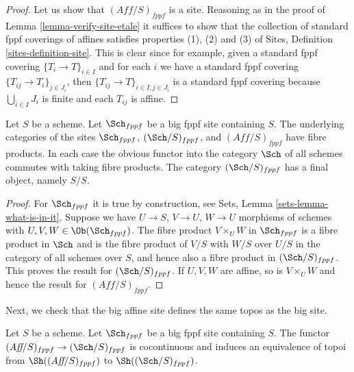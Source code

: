 \begin{proof}
Let us show that $(\textit{Aff}/S)_{fppf}$ is a site.
Reasoning as in the proof of Lemma \ref{lemma-verify-site-etale}
it suffices to show that the collection
of standard fppf coverings of affines satisfies properties
(1), (2) and (3) of
Sites, Definition \ref{sites-definition-site}.
This is clear since for example, given a standard fppf
covering $\{T_i \to T\}_{i\in I}$ and for each
$i$ we have a standard fppf covering $\{T_{ij} \to T_i\}_{j\in J_i}$, then
$\{T_{ij} \to T\}_{i \in I, j\in J_i}$ is a standard fppf covering
because $\bigcup_{i\in I} J_i$ is finite and each $T_{ij}$ is affine.
\end{proof}

\begin{lemma}
\label{lemma-fibre-products-fppf}
Let $S$ be a scheme. Let $\Sch_{fppf}$ be a big fppf
site containing $S$. The underlying categories of the sites
$\Sch_{fppf}$, $(\Sch/S)_{fppf}$,
and $(\textit{Aff}/S)_{fppf}$ have fibre products.
In each case the obvious functor into the category $\Sch$ of
all schemes commutes with taking fibre products. The category
$(\Sch/S)_{fppf}$ has a final object, namely $S/S$.
\end{lemma}

\begin{proof}
For $\Sch_{fppf}$ it is true by construction, see
Sets, Lemma \ref{sets-lemma-what-is-in-it}.
Suppose we have $U \to S$, $V \to U$, $W \to U$ morphisms
of schemes with $U, V, W \in \Ob(\Sch_{fppf})$.
The fibre product $V \times_U W$ in $\Sch_{fppf}$
is a fibre product in $\Sch$ and
is the fibre product of $V/S$ with $W/S$ over $U/S$ in
the category of all schemes over $S$, and hence also a
fibre product in $(\Sch/S)_{fppf}$.
This proves the result for $(\Sch/S)_{fppf}$.
If $U, V, W$ are affine, so is $V \times_U W$ and hence the
result for $(\textit{Aff}/S)_{fppf}$.
\end{proof}

\noindent
Next, we check that the big affine site defines the same
topos as the big site.

\begin{lemma}
\label{lemma-affine-big-site-fppf}
Let $S$ be a scheme. Let $\Sch_{fppf}$ be a big fppf
site containing $S$.
The functor $(\textit{Aff}/S)_{fppf} \to (\Sch/S)_{fppf}$
is cocontinuous and induces an equivalence of topoi from
$\Sh((\textit{Aff}/S)_{fppf})$ to
$\Sh((\Sch/S)_{fppf})$.
\end{lemma}

